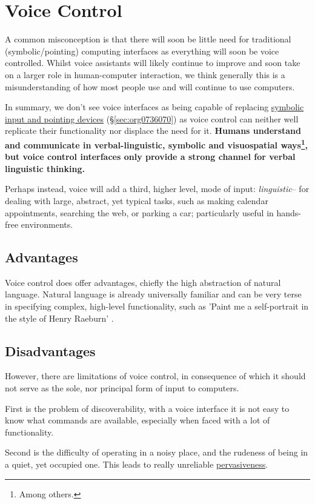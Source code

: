 \documentclass[logo,bsc,singlespacing,parskip]{infthesis}
\begin{document}
\section{Voice Control}
\label{sec:org238989b}
A common misconception is that there will soon be little need for traditional (symbolic/pointing) computing interfaces as everything will soon be voice controlled.
Whilst voice assistants will likely continue to improve and soon take on a larger role in human-computer interaction, we think generally this is a misunderstanding of how most people use and will continue to use computers.

In summary, we don't see voice interfaces as being capable of replacing \hyperref[sec:org0736070]{symbolic input and pointing devices} (\S \ref{sec:org0736070}) as voice control can neither well replicate their functionality nor displace the need for it.
\textbf{Humans understand and communicate in verbal-linguistic, symbolic and visuospatial ways\footnote{Among others.}, but voice control interfaces only provide a strong channel for verbal linguistic thinking.}

Perhaps instead, voice will add a third, higher level, mode of input: \emph{linguistic}-- for dealing with large, abstract, yet typical tasks, such as making calendar appointments, searching the web, or parking a car; particularly useful in hands-free environments.

\subsection{Advantages}
\label{sec:org4f9e29d}
Voice control does offer advantages, chiefly the high abstraction of natural language.
Natural language is already universally familiar and can be very terse in specifying complex, high-level functionality, such as 'Paint me a self-portrait in the style of Henry Raeburn' \autocite{DALLa}.

\subsection{Disadvantages}
\label{sec:orgf800b9d}
However, there are limitations of voice control, in consequence of which it should not serve as the sole, nor principal form of input to computers.

First is the problem of discoverability, with a voice interface it is not easy to know what commands are available, especially when faced with a lot of functionality.

Second is the difficulty of operating in a noisy place, and the rudeness of being in a quiet, yet occupied one.
This leads to really unreliable \hyperref[pervasiveness]{pervasiveness}.
\end{document}
